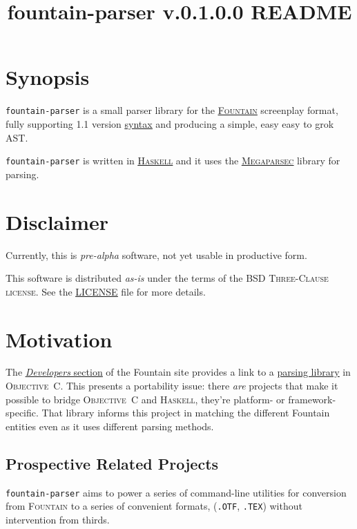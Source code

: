 \documentclass[11pt]{article}
\newcommand{\link}[2]{\underline{\color{darkblue}\href{#1}{#2}}}
\begin{document}
\title{\textbf{fountain-parser v.0.1.0.0 README}}
\author{}
\date{}
\maketitle

\section*{Synopsis} \texttt{fountain-parser} is a small parser library
for the \link{https://fountain.io/}{\textsc{Fountain}} screenplay
format, fully supporting 1.1 version
\link{https://fountain.io/syntax/}{syntax} and producing a simple, easy
easy to grok \textsc{AST}.

\texttt{fountain-parser} is written in
\link{https://haskell.org}{\textsc{Haskell}} and it uses the
\link{https://hackage.haskell.org/package/megaparsec}{\textsc{Megaparsec}}
library for parsing.

\section*{Disclaimer}
Currently, this is \emph{pre-alpha} software, not yet usable in
productive form.

This software is distributed \emph{as-is} under the terms of the
\textsc{BSD Three-Clause license}.  See the
\link{run:./LICENSE}{LICENSE} file for more details.

\section*{Motivation} The
\link{https://fountain.io/developers/}{\emph{Developers} section} of the
Fountain site provides a link to a
\link{https://github.com/nyousefi/Fountain}{parsing library} in
\textsc{Objective~C}. This presents a portability issue: there
\emph{are} projects that make it possible to bridge \textsc{Objective~C}
and \textsc{Haskell}, they’re platform- or framework-specific.  That
library informs this project in matching the different Fountain entities
even as it uses different parsing methods.

\subsection*{Prospective Related Projects}
\texttt{fountain-parser} aims to power a series of command-line
utilities for conversion from \textsc{Fountain} to a series of
convenient formats, (\texttt{.OTF}, \texttt{.TEX}) without intervention
from thirds.
\end{document}
